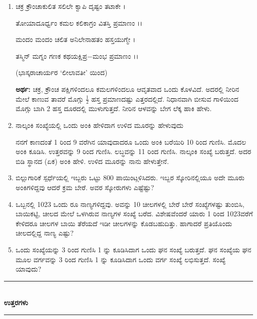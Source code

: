\begin{enumerate}
\item ಚಕ್ರ ಕ್ರೌಂಚಾಕುಲಿತ ಸಲಿಲೇ ಕ್ವಾಪಿ ದೃಷ್ಟಂ ತಟಾಕೇ । 

ತೋಯಾದೂರ್ಧ್ವಂ ಕಮಲ ಕಲಿಕಾಗ್ರಂ ವಿತಸ್ತಿ ಪ್ರಮಾಣಂ ।।

ಮಂದಂ ಮಂದಂ ಚಲಿತ ಅನಿಲೇನಾಹತಂ ಹಸ್ತಯುಗ್ಮೇ ।

ತಸ್ಮಿನ್ ಮಗ್ನಂ ಗಣಕ ಕಥಯಕ್ಷಿಪ್ರ$-$ಮಂಭ ಪ್ರಮಾಣಂ ।।

\smallskip
\hfill (ಭಾಸ್ಕರಾಚಾರ್ಯರ `ಲೀಲಾವತೀ' ಯಿಂದ)

\smallskip
{\bf ಅರ್ಥ:} ಚಕ್ರ, ಕ್ರೌಂಚ ಪಕ್ಷಿಗಳಿಂದಲೂ ಕಮಲಗಳಿಂದಲೂ ಆವೃತವಾದ ಒಂದು ಕೊಳವಿದೆ. ಅದರಲ್ಲಿ ನೀರಿನ ಮೇಲೆ ಕಾಣುವ ತಾವರೆ ಮೊಗ್ಗು $\frac{1}{2}$ ಹಸ್ತ ಪ್ರಮಾಣದಷ್ಟು ಎತ್ತರದಲ್ಲಿದೆ. ನಿಧಾನವಾಗಿ ಬೀಸುವ ಗಾಳಿಯಿಂದ ಮೊಗ್ಗು ಬಾಗಿ 2 ಹಸ್ತ ದೂರದಲ್ಲಿ ಮುಳುಗುತ್ತದೆ. ನೀರಿನ ಆಳವನ್ನು ಬೇಗ ಲೆಕ್ಕ ಹಾಕಿ ಹೇಳು. 

\item ನಾಲ್ಕಂಕಿ ಸಂಖ್ಯೆಯಲ್ಲಿ ಒಂದು ಅಂಕಿ ಹೇಳಿದಾಗ ಉಳಿದ ಮೂರನ್ನು ಹೇಳುವುದು 

ನನಗೆ ಕಾಣದಂತೆ 1 ರಿಂದ 9 ವರೆಗಿನ ಯಾವುದಾದರೂ ಒಂದು ಅಂಕಿ ಬರೆಯಿರಿ 10 ರಿಂದ ಗುಣಿಸಿ. ಮೊದಲ ಅಂಕಿ ಕೂಡಿಸಿ. ಉತ್ತರವನ್ನು 9 ರಿಂದ ಗುಣಿಸಿ. ಲಬ್ಧವನ್ನು 11 ರಿಂದ ಗುಣಿಸಿ. ನಾಲ್ಕಂಕಿ ಸಂಖ್ಯೆ ಬರುತ್ತದೆ. ಅದರ ಬಿಡಿ ಸ್ಥಾನದ (ಏಕ) ಅಂಕಿ ಹೇಳಿ. ಉಳಿದ ಮೂರನ್ನು ನಾನು ಹೇಳುತ್ತೇನೆ.

\item ಬಿಲ್ಲುಗಾರಿಕೆ ಸ್ಪರ್ಧೆಯಲ್ಲಿ ಇಬ್ಬರು ಒಟ್ಟು 800 ಪಾಯಿಂಟ್ಗಳಿಸಿದರು. ಇಬ್ಬರ ಸ್ಕೋರಿನಲ್ಲಿಯೂ ಅದೇ ಮೂರು ಅಂಕಿಗಳಿದ್ದವು ಆದರೆ ಕ್ರಮ ಬೇರೆ. ಅವರ ಸ್ಕೋರುಗಳು ಎಷ್ಟೆಷ್ಟು? 

\item ಒಬ್ಬನಲ್ಲಿ 1023 ಒಂದು ರೂ ನಾಣ್ಯಗಳಿದ್ದವು. ಅವನ್ನು 10 ಚೀಲಗಳಲ್ಲಿ ಬೇರೆ ಬೇರೆ ಸಂಖ್ಯೆಗಳಷ್ಟು ತುಂಬಿಸಿ, ಬಾಯಿಕಟ್ಟಿ, ಚೀಲದ ಮೇಲೆ ಒಳಗಿರುವ ನಾಣ್ಯಗಳ ಸಂಖ್ಯೆ ಬರೆದ. ವಿಶೇಷವೆಂದರೆ ಯಾರು 1 ರಿಂದ 1023ವರೆಗೆ ಕೇಳಿದರೂ ಚೀಲಗಳ ಬಾಯಿ ತೆರೆಯದೆ ಇಡೀ ಚೀಲಗಳನ್ನು ಕೊಡಬಹುದಿತ್ತು. ಹಾಗಾದರೆ ಪ್ರತಿಯೊಂದು ಚೀಲದಲ್ಲಿದ್ದ ನಾಣ್ಯ ಎಷ್ಟು? 

\item ಒಂದು ಸಂಖ್ಯೆಯನ್ನು 3 ರಿಂದ ಗುಣಿಸಿ 1 ನ್ನು ಕೂಡಿಸಿದಾಗ ಒಂದು ಘನ ಸಂಖ್ಯೆ ಬರುತ್ತದೆ. ಘನ ಸಂಖ್ಯೆಯ ಘನ ಮೂಲ ವರ್ಗವನ್ನು 3 ರಿಂದ ಗುಣಿಸಿ 1 ನ್ನು ಕೂಡಿಸಿದಾಗ ಒಂದು ವರ್ಗ ಸಂಖ್ಯೆ ಲಭಿಸುತ್ತದೆ. ಸಂಖ್ಯೆ ಯಾವುದು?
\end{enumerate}



\begin{center}
\rule{5cm}{1pt}\\[3pt]
{\Large\bfseries ಉತ್ತರಗಳು}\\[-0.1cm]
\rule{5cm}{1pt}
\end{center}



